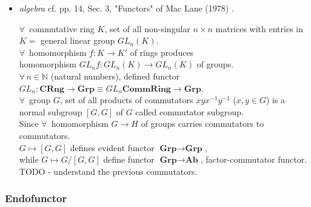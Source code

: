 \begin{itemize}
\item \emph{algebra} cf. pp. 14, Sec. 3, "Functors" of Mac Lane (1978) \cite{agat:MacL1978}.

$\forall \, $ commutative ring $K$, set of all non-singular $n\times n$ matrices with entries in $K = $ general linear group $GL_n(K)$. \\
$\forall \, $ homomorphism $f: K \to K'$ of rings produces \\
homomorphism $GL_n f : GL_n(K) \to GL_n(K)$ of groups.  \\

$\forall \, n \in \mathbb{N}$ (natural numbers), defined functor $GL_n: \textbf{CRng} \to \textbf{Grp} \equiv GL_n \textbf{CommRing} \to \textbf{Grp}$.  \\


$\forall \, $ group $G$, set of all products of commutators $xyx^{-1} y^{-1}$ ($x,y \in G$) is a normal subgroup $[G, G]$ of $G$ called commutator subgroup. \\

Since $\forall \, $ homomorphism $G \to H$ of groups carries commutators to commutators.  \\
$G \mapsto [G, G]$ defines evident functor $\textbf{Grp} \to \textbf{Grp}$, \\
while $G \mapsto G/[G, G]$ define functor $\textbf{Grp} \to \textbf{Ab}$, factor-commutator functor. \\
TODO - understand the previous commutators.

\end{itemize} 

\subsubsection{Endofunctor}

